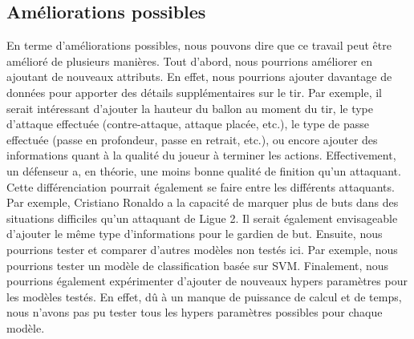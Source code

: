 \documentclass[12pt]{article}
\begin{document}
\subsection{Améliorations possibles}
En terme d'améliorations possibles, nous pouvons dire que ce travail peut être amélioré de plusieurs manières.
Tout d'abord, nous pourrions améliorer en ajoutant de nouveaux attributs.
En effet, nous pourrions ajouter davantage de données pour apporter des détails supplémentaires sur le tir.
Par exemple, il serait intéressant d'ajouter la hauteur du ballon au moment du tir, le type d'attaque effectuée (contre-attaque, attaque placée, etc.), le type de passe effectuée (passe en profondeur, passe en retrait, etc.), ou encore ajouter des informations quant à la qualité du joueur à terminer les actions.
Effectivement, un défenseur a, en théorie, une moins bonne qualité de finition qu'un attaquant.
Cette différenciation pourrait également se faire entre les différents attaquants.
Par exemple, Cristiano Ronaldo a la capacité de marquer plus de buts dans des situations difficiles qu'un attaquant de Ligue 2.
Il serait également envisageable d'ajouter le même type d'informations pour le gardien de but.
\newline\newline
Ensuite, nous pourrions tester et comparer d'autres modèles non testés ici.
Par exemple, nous pourrions tester un modèle de classification basée sur SVM.
Finalement, nous pourrions également expérimenter d'ajouter de nouveaux hypers paramètres pour les modèles testés.
En effet, dû à un manque de puissance de calcul et de temps, nous n'avons pas pu tester tous les hypers paramètres possibles pour chaque modèle.

\newpage



\end{document}
